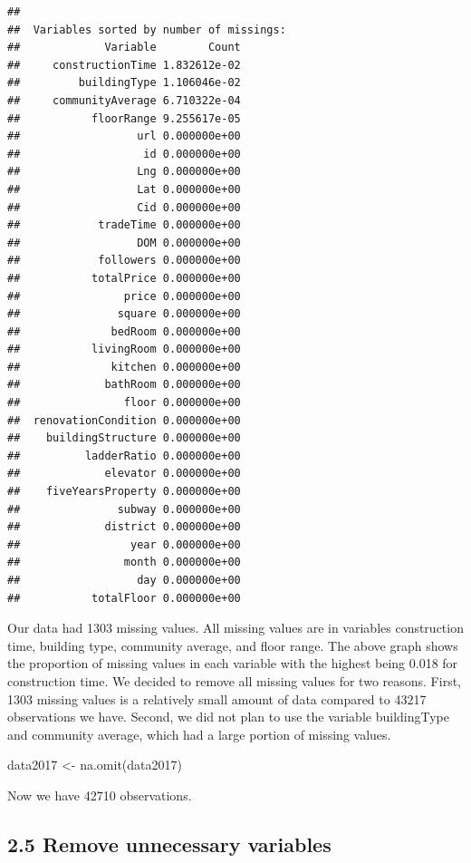 \documentclass[
]{article}
\newenvironment{Shaded}{\begin{snugshade}}{\end{snugshade}}
\newcommand{\FunctionTok}[1]{\textcolor[rgb]{0.00,0.00,0.00}{#1}}
\newcommand{\NormalTok}[1]{#1}
\newcommand{\OtherTok}[1]{\textcolor[rgb]{0.56,0.35,0.01}{#1}}
\begin{document}
\begin{verbatim}
## 
##  Variables sorted by number of missings: 
##             Variable        Count
##     constructionTime 1.832612e-02
##         buildingType 1.106046e-02
##     communityAverage 6.710322e-04
##           floorRange 9.255617e-05
##                  url 0.000000e+00
##                   id 0.000000e+00
##                  Lng 0.000000e+00
##                  Lat 0.000000e+00
##                  Cid 0.000000e+00
##            tradeTime 0.000000e+00
##                  DOM 0.000000e+00
##            followers 0.000000e+00
##           totalPrice 0.000000e+00
##                price 0.000000e+00
##               square 0.000000e+00
##              bedRoom 0.000000e+00
##           livingRoom 0.000000e+00
##              kitchen 0.000000e+00
##             bathRoom 0.000000e+00
##                floor 0.000000e+00
##  renovationCondition 0.000000e+00
##    buildingStructure 0.000000e+00
##          ladderRatio 0.000000e+00
##             elevator 0.000000e+00
##    fiveYearsProperty 0.000000e+00
##               subway 0.000000e+00
##             district 0.000000e+00
##                 year 0.000000e+00
##                month 0.000000e+00
##                  day 0.000000e+00
##           totalFloor 0.000000e+00
\end{verbatim}

Our data had 1303 missing values. All missing values are in variables
construction time, building type, community average, and floor range.
The above graph shows the proportion of missing values in each variable
with the highest being 0.018 for construction time. \newline We decided
to remove all missing values for two reasons. First, 1303 missing values
is a relatively small amount of data compared to 43217 observations we
have. Second, we did not plan to use the variable buildingType and
community average, which had a large portion of missing values.

\begin{Shaded}
\begin{Highlighting}[]
\NormalTok{data2017 }\OtherTok{\textless{}{-}} \FunctionTok{na.omit}\NormalTok{(data2017)}
\end{Highlighting}
\end{Shaded}

Now we have 42710 observations.

\hypertarget{remove-unnecessary-variables}{%
\subsection{2.5 Remove unnecessary
variables}\label{remove-unnecessary-variables}}
\end{document}
